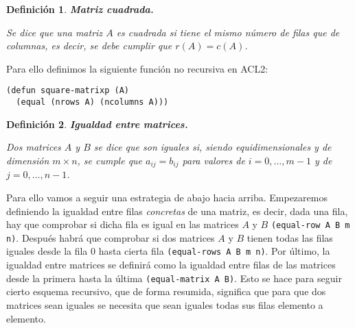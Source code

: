 \documentclass[a4paper,10pt]{article}
\newtheorem{defi}{{Definición}}
\begin{document}
\par \vspace{12pt}

\begin{defi} \textbf{Matriz cuadrada.}\vspace{8pt}\par
Se dice que una matriz $A$ es \emph{cuadrada} si tiene el mismo número de filas que de columnas, es decir, se debe cumplir que $r(A) = c(A)$.
\end{defi}

\par \vspace{10pt}

Para ello definimos la siguiente función no recursiva en ACL2:

\par \vspace{10pt}

\begin{lstlisting}[language=clips]
(defun square-matrixp (A)
  (equal (nrows A) (ncolumns A)))
\end{lstlisting}

\par \vspace{12pt}

\begin{defi} \textbf{Igualdad entre matrices.}\vspace{8pt}\par
Dos matrices $A$ y $B$ se dice que son \emph{iguales} si, siendo equidimensionales y de dimensión $m \times n$, se cumple que $a_{ij} = b_{ij}$ para valores de $i = 0, \dots, m-1$ y de $j = 0, \dots, n-1$.
\end{defi}

\par \vspace{10pt}		

Para ello vamos a seguir una estrategia de abajo hacia arriba. Empezaremos definiendo la igualdad entre filas \emph{concretas} de una matriz, es decir, dada una fila, hay que comprobar si dicha fila es igual en las matrices $A$ y $B$ \texttt{(equal-row A B m n)}. Después habrá que comprobar si dos matrices $A$ y $B$ tienen todas las filas iguales desde la fila 0 hasta cierta fila \texttt{(equal-rows A B m n)}. Por último, la igualdad entre matrices se definirá como la igualdad entre filas de las matrices desde la primera hasta la última \texttt{(equal-matrix A B)}. Esto se hace para seguir cierto esquema recursivo, que de forma resumida, significa que para que dos matrices sean iguales se necesita que sean iguales todas sus filas elemento a elemento.
\end{document}
